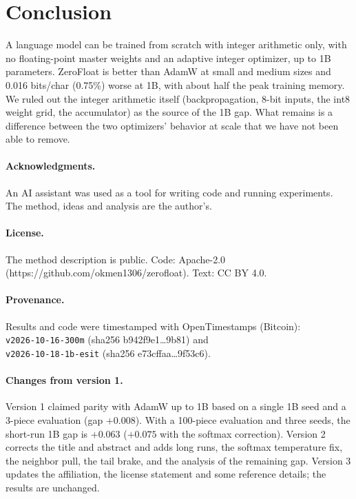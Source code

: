 \documentclass[11pt]{article}
\begin{document}
\section{Conclusion}
A language model can be trained from scratch with integer arithmetic only, with no floating-point master weights and an adaptive integer optimizer, up to 1B parameters. ZeroFloat is better than AdamW at small and medium sizes and 0.016 bits/char (0.75\%) worse at 1B, with about half the peak training memory. We ruled out the integer arithmetic itself (backpropagation, 8-bit inputs, the int8 weight grid, the accumulator) as the source of the 1B gap. What remains is a difference between the two optimizers' behavior at scale that we have not been able to remove.

\paragraph{Acknowledgments.} An AI assistant was used as a tool for writing code and running experiments. The method, ideas and analysis are the author's.

\paragraph{License.} The method description is public. Code: Apache-2.0 (https://github.com/okmen1306/zerofloat). Text: CC BY 4.0.

\paragraph{Provenance.} Results and code were timestamped with OpenTimestamps (Bitcoin):\\ \texttt{v2026-10-16-300m} (sha256 b942f9e1\ldots9b81) and\\ \texttt{v2026-10-18-1b-esit} (sha256 e73cffaa\ldots9f53c6).

\paragraph{Changes from version 1.} Version 1 claimed parity with AdamW up to 1B based on a single 1B seed and a 3-piece evaluation (gap $+0.008$). With a 100-piece evaluation and three seeds, the short-run 1B gap is $+0.063$ ($+0.075$ with the softmax correction). Version 2 corrects the title and abstract and adds long runs, the softmax temperature fix, the neighbor pull, the tail brake, and the analysis of the remaining gap. Version 3 updates the affiliation, the license statement and some reference details; the results are unchanged.
\end{document}
